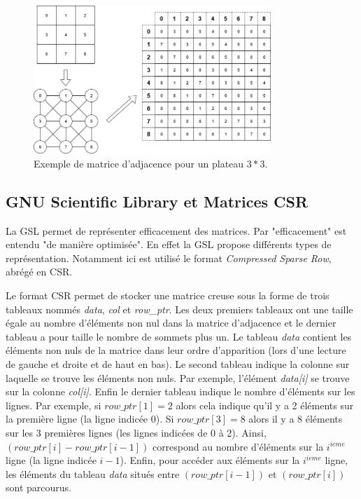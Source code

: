 \documentclass[a4paper]{article}
\begin{document}
\begin{figure}[h!] 
    \centering
    \includegraphics[width=0.8\textwidth]{matriceAdja.png}
    \caption{Exemple de matrice d'adjacence pour un plateau $3 * 3$.}
    \label{fig:exemplematrice}
\end{figure}


\subsection{GNU Scientific Library et Matrices CSR}

La GSL permet de représenter efficacement des matrices. Par "efficacement" est entendu "de manière optimisée". En effet la GSL propose différents types de représentation. Notamment ici est utilisé le format \emph{Compressed Sparse Row}, abrégé en CSR.

Le format CSR permet de stocker une matrice creuse sous la forme de trois tableaux nommés \emph{data}, \emph{col} et \emph{row\_ptr}. Les deux premiers tableaux ont une taille égale au nombre d'éléments non nul dans la matrice d'adjacence et le dernier tableau a pour taille le nombre de sommets plus un. Le tableau \emph{data} contient les éléments non nuls de la matrice dans leur ordre d'apparition (lors d'une lecture de gauche et droite et de haut en bas). Le second tableau indique la colonne sur laquelle se trouve les éléments non nuls. Par exemple, l'élément \emph{data[i]} se trouve sur la colonne \emph{col[i]}. Enfin le dernier tableau indique le nombre d'éléments sur les lignes. Par exemple, si $row\_ptr[1] = 2$ alors cela indique qu'il y a 2 éléments sur la première ligne (la ligne indicée 0). Si $row\_ptr[3] = 8$ alors il y a 8 éléments sur les 3 premières lignes (les lignes indicées de 0 à 2). Ainsi, $(row\_ptr[i] - row\_ptr[i-1])$ correspond au nombre d'éléments sur la $i^{ieme}$ ligne (la ligne indicée $i-1$).  Enfin, pour accéder aux éléments sur la $i^{ieme}$ ligne, les éléments du tableau \emph{data} situés entre $(row\_ptr[i-1])$ et $(row\_ptr[i])$ sont parcourus.
\end{document}
